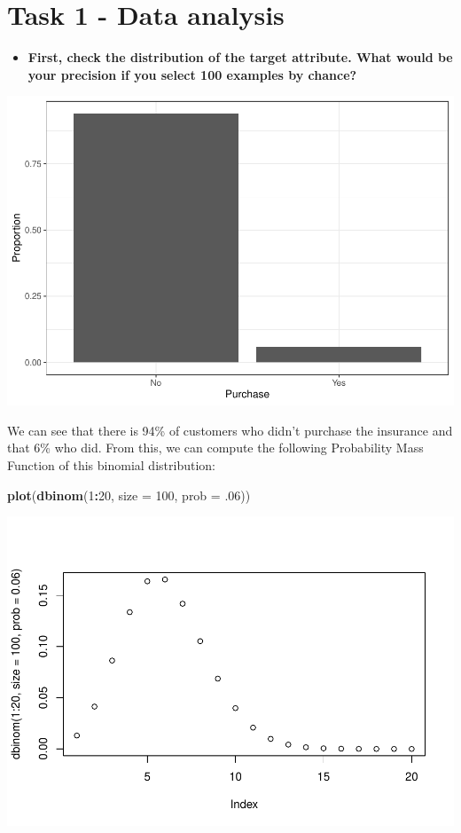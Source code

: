 \documentclass[
  12pt,
  oneside]{report}
\newenvironment{Shaded}{\begin{snugshade}}{\end{snugshade}}
\newcommand{\DataTypeTok}[1]{\textcolor[rgb]{0.13,0.29,0.53}{#1}}
\newcommand{\DecValTok}[1]{\textcolor[rgb]{0.00,0.00,0.81}{#1}}
\newcommand{\FloatTok}[1]{\textcolor[rgb]{0.00,0.00,0.81}{#1}}
\newcommand{\KeywordTok}[1]{\textcolor[rgb]{0.13,0.29,0.53}{\textbf{#1}}}
\newcommand{\NormalTok}[1]{#1}
\newcommand{\OperatorTok}[1]{\textcolor[rgb]{0.81,0.36,0.00}{\textbf{#1}}}
\providecommand{\tightlist}{%
  \setlength{\itemsep}{0pt}\setlength{\parskip}{0pt}}
\begin{document}
\hypertarget{task1}{%
\chapter{Task 1 - Data analysis}\label{task1}}

\begin{itemize}
\tightlist
\item
  \textbf{First, check the distribution of the target attribute. What would be your precision if you select 100 examples by chance?}
\end{itemize}

\includegraphics{leroy_francois_hw2_files/figure-latex/unnamed-chunk-5-1.pdf}

We can see that there is 94\% of customers who didn't purchase the insurance and that 6\% who did. From this, we can compute the following Probability Mass Function of this binomial distribution:

\begin{Shaded}
\begin{Highlighting}[]
\KeywordTok{plot}\NormalTok{(}\KeywordTok{dbinom}\NormalTok{(}\DecValTok{1}\OperatorTok{:}\DecValTok{20}\NormalTok{, }\DataTypeTok{size =} \DecValTok{100}\NormalTok{, }\DataTypeTok{prob =} \FloatTok{.06}\NormalTok{))}
\end{Highlighting}
\end{Shaded}

\includegraphics{leroy_francois_hw2_files/figure-latex/unnamed-chunk-6-1.pdf}
\end{document}
